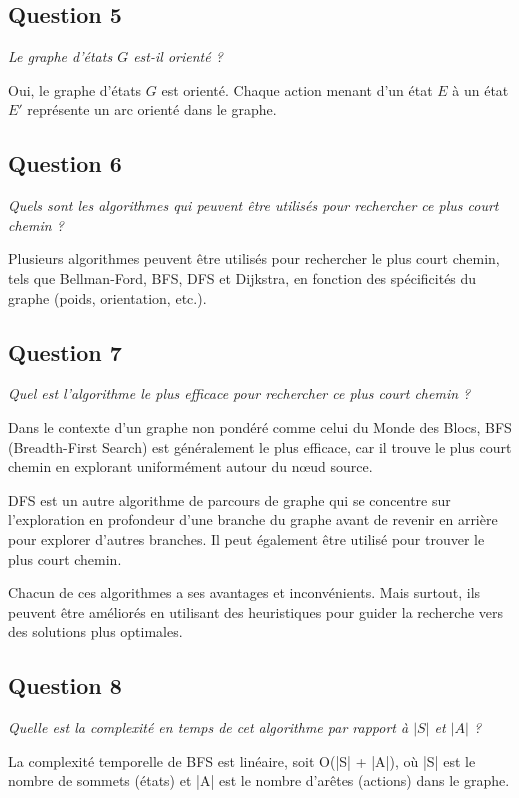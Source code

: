 \subsection{Question 5}

\textit{Le graphe d'états $G$ est-il orienté ?}

Oui, le graphe d'états $G$ est orienté. Chaque action menant d'un état $E$ à un état $E'$ représente un arc orienté dans le graphe.

\subsection{Question 6}

\textit{Quels sont les algorithmes qui peuvent être utilisés pour rechercher ce plus court chemin ?}

Plusieurs algorithmes peuvent être utilisés pour rechercher le plus court chemin, tels que Bellman-Ford, BFS, DFS et Dijkstra, en fonction des spécificités du graphe (poids, orientation, etc.).

\subsection{Question 7}

\textit{Quel est l'algorithme le plus efficace pour rechercher ce plus court chemin ?}

Dans le contexte d'un graphe non pondéré comme celui du Monde des Blocs, BFS (Breadth-First Search) est généralement le plus efficace, car il trouve le plus court chemin en explorant uniformément autour du nœud source.

DFS est un autre algorithme de parcours de graphe qui se concentre sur l'exploration en profondeur d'une branche du graphe avant de revenir en arrière pour explorer d'autres branches. Il peut également être utilisé pour trouver le plus court chemin. 

Chacun de ces algorithmes a ses avantages et inconvénients. Mais surtout, ils peuvent être améliorés en utilisant des heuristiques pour guider la recherche vers des solutions plus optimales.

\subsection{Question 8}

\textit{Quelle est la complexité en temps de cet algorithme par rapport à $|S|$ et $|A|$ ?}

La complexité temporelle de BFS est linéaire, soit O(|S| + |A|), où |S| est le nombre de sommets (états) et |A| est le nombre d'arêtes (actions) dans le graphe.

